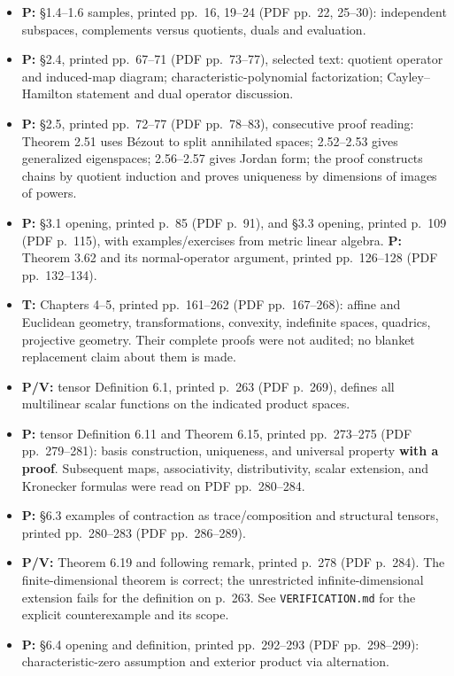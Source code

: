 \documentclass[
  11pt,
]{article}
\providecommand{\tightlist}{%
  \setlength{\itemsep}{0pt}\setlength{\parskip}{0pt}}
\begin{document}
\begin{itemize}
\tightlist
\item
  \textbf{P:} §1.4--1.6 samples, printed pp.~16, 19--24 (PDF pp.~22,
  25--30): independent subspaces, complements versus quotients, duals
  and evaluation.
\item
  \textbf{P:} §2.4, printed pp.~67--71 (PDF pp.~73--77), selected text:
  quotient operator and induced-map diagram; characteristic-polynomial
  factorization; Cayley--Hamilton statement and dual operator
  discussion.
\item
  \textbf{P:} §2.5, printed pp.~72--77 (PDF pp.~78--83), consecutive
  proof reading: Theorem 2.51 uses Bézout to split annihilated spaces;
  2.52--2.53 gives generalized eigenspaces; 2.56--2.57 gives Jordan
  form; the proof constructs chains by quotient induction and proves
  uniqueness by dimensions of images of powers.
\item
  \textbf{P:} §3.1 opening, printed p.~85 (PDF p.~91), and §3.3 opening,
  printed p.~109 (PDF p.~115), with examples/exercises from metric
  linear algebra. \textbf{P:} Theorem 3.62 and its normal-operator
  argument, printed pp.~126--128 (PDF pp.~132--134).
\item
  \textbf{T:} Chapters 4--5, printed pp.~161--262 (PDF pp.~167--268):
  affine and Euclidean geometry, transformations, convexity, indefinite
  spaces, quadrics, projective geometry. Their complete proofs were not
  audited; no blanket replacement claim about them is made.
\item
  \textbf{P/V:} tensor Definition 6.1, printed p.~263 (PDF p.~269),
  defines all multilinear scalar functions on the indicated product
  spaces.
\item
  \textbf{P:} tensor Definition 6.11 and Theorem 6.15, printed
  pp.~273--275 (PDF pp.~279--281): basis construction, uniqueness, and
  universal property \textbf{with a proof}. Subsequent maps,
  associativity, distributivity, scalar extension, and Kronecker
  formulas were read on PDF pp.~280--284.
\item
  \textbf{P:} §6.3 examples of contraction as trace/composition and
  structural tensors, printed pp.~280--283 (PDF pp.~286--289).
\item
  \textbf{P/V:} Theorem 6.19 and following remark, printed p.~278 (PDF
  p.~284). The finite-dimensional theorem is correct; the unrestricted
  infinite-dimensional extension fails for the definition on p.~263. See
  \texttt{VERIFICATION.md} for the explicit counterexample and its
  scope.
\item
  \textbf{P:} §6.4 opening and definition, printed pp.~292--293 (PDF
  pp.~298--299): characteristic-zero assumption and exterior product via
  alternation.
\end{itemize}
\end{document}
